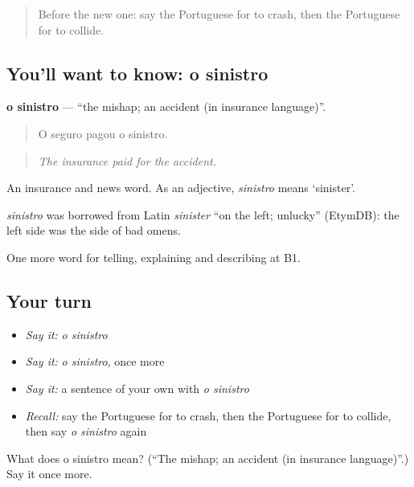 \label{lesson:PT-C299-sinistro}



\begin{quote}
Before the new one: say the Portuguese for to crash, then the Portuguese for to collide.
\end{quote}

\subsection*{You'll want to know: o sinistro}
\textbf{o sinistro} — \textquotedblleft{}the mishap; an accident (in insurance language)\textquotedblright{}.

\begin{quote}
O seguro pagou o sinistro.
\end{quote}

\begin{quote}
\emph{The insurance paid for the accident.}
\end{quote}

An insurance and news word. As an adjective, \emph{sinistro} means ‘sinister’.

\begin{cousinweb}
\emph{sinistro} was borrowed from Latin \emph{sinister} \textquotedblleft{}on the left; unlucky\textquotedblright{} (EtymDB): the left side was the side of bad omens.
\end{cousinweb}

\begin{grammarlens}[title={What you've built}]
One more word for telling, explaining and describing at B1.
\end{grammarlens}

\subsection*{Your turn}
\begin{itemize}
\raggedright
  \item \emph{Say it:} \emph{o sinistro}
  \item \emph{Say it:} \emph{o sinistro}, once more
  \item \emph{Say it:} a sentence of your own with \emph{o sinistro}
  \item \emph{Recall:} say the Portuguese for to crash, then the Portuguese for to collide, then say \emph{o sinistro} again
\end{itemize}

\begin{tcolorbox}[breakable,colback=teal!4,colframe=teal!35!black,title={Before you move on}]
What does o sinistro mean? (\textquotedblleft{}The mishap; an accident (in insurance language)\textquotedblright{}.) Say it once more.
\end{tcolorbox}
